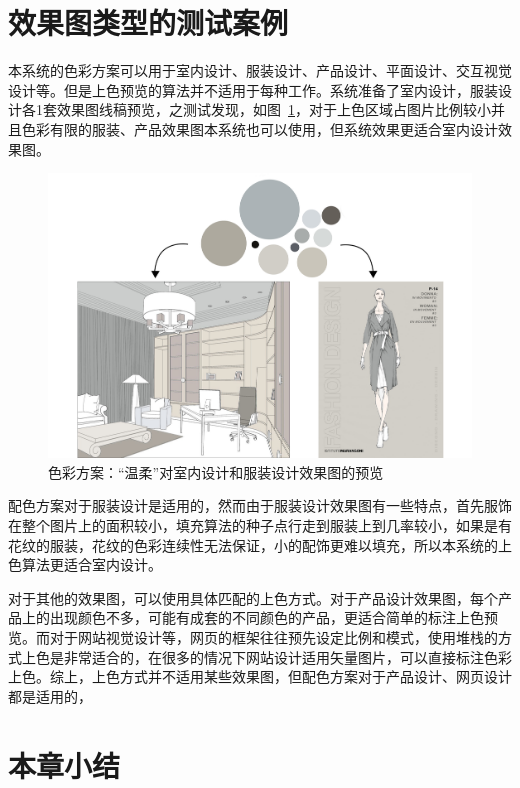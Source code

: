 \section{效果图类型的测试案例}

本系统的色彩方案可以用于室内设计、服装设计、产品设计、平面设计、交互视觉设计等。但是上色预览的算法并不适用于每种工作。系统准备了室内设计，服装设计各1套效果图线稿预览，之测试发现，如图~\ref{figure:温柔_IandF}，对于上色区域占图片比例较小并且色彩有限的服装、产品效果图本系统也可以使用，但系统效果更适合室内设计效果图。

\begin{figure}[!htbp]
\centering
\includegraphics[width=\linewidth,keepaspectratio]{data/chapter-4/温柔_IandF.jpg}
\caption{色彩方案：“温柔”对室内设计和服装设计效果图的预览}
\label{figure:温柔_IandF}
\end{figure}

配色方案对于服装设计是适用的，然而由于服装设计效果图有一些特点，首先服饰在整个图片上的面积较小，填充算法的种子点行走到服装上到几率较小，如果是有花纹的服装，花纹的色彩连续性无法保证，小的配饰更难以填充，所以本系统的上色算法更适合室内设计。

对于其他的效果图，可以使用具体匹配的上色方式。对于产品设计效果图，每个产品上的出现颜色不多，可能有成套的不同颜色的产品，更适合简单的标注上色预览。而对于网站视觉设计等，网页的框架往往预先设定比例和模式，使用堆栈的方式上色是非常适合的，在很多的情况下网站设计适用矢量图片，可以直接标注色彩上色。综上，上色方式并不适用某些效果图，但配色方案对于产品设计、网页设计都是适用的，

\section{本章小结}

